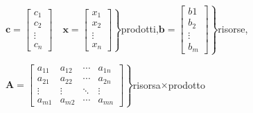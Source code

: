 \documentclass{beamer}
\def\lyxframeend{} %
\begin{document}
\lyxframeend{}
{\small
$\left.\mathbf{c}=\left[\begin{array}{c}
c_{1}\\
c_{2}\\
\vdots\\
c_{n}
\end{array}\right]\quad\mathbf{x}=\left[\begin{array}{c}
x_{1}\\
x_{2}\\
\vdots\\
x_{n}
\end{array}\right]\right\} $prodotti,$\left.\mathbf{b}=\left[\begin{array}{c}
b1\\
b_{2}\\
\vdots\\
b_{m}
\end{array}\right]\right\} $risorse,

$\left.\mathbf{A}=\left[\begin{array}{cccc}
a_{11} & a_{12} & \cdots & a_{1n}\\
a_{21} & a_{22} & \cdots & a_{2n}\\
\vdots & \vdots & \ddots & \vdots\\
a_{m1} & a_{m2} & \cdots & a_{mn}
\end{array}\right]\right\} $risorsa$\times$prodotto

\begin{center}
\end{center}
}
\end{document}
